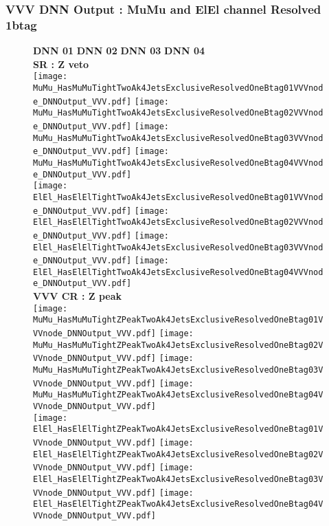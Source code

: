 \documentclass[9pt]{beamer}
\begin{document}
\begin{frame}
	\frametitle{VVV DNN Output : MuMu and ElEl channel Resolved 1btag}
	\begin{figure}
	    \textbf{DNN 01} \hspace{1.2cm} \textbf{DNN 02} \hspace{1.2cm} \textbf{DNN 03} \hspace{1.2cm} \textbf{DNN 04} \\
        \centering
        \textbf{SR : Z veto} \\
		\texttt{[image: MuMu\_HasMuMuTightTwoAk4JetsExclusiveResolvedOneBtag01VVVnode\_DNNOutput\_VVV.pdf]}
		\texttt{[image: MuMu\_HasMuMuTightTwoAk4JetsExclusiveResolvedOneBtag02VVVnode\_DNNOutput\_VVV.pdf]}
		\texttt{[image: MuMu\_HasMuMuTightTwoAk4JetsExclusiveResolvedOneBtag03VVVnode\_DNNOutput\_VVV.pdf]}
		\texttt{[image: MuMu\_HasMuMuTightTwoAk4JetsExclusiveResolvedOneBtag04VVVnode\_DNNOutput\_VVV.pdf]}\\
		\texttt{[image: ElEl\_HasElElTightTwoAk4JetsExclusiveResolvedOneBtag01VVVnode\_DNNOutput\_VVV.pdf]}
		\texttt{[image: ElEl\_HasElElTightTwoAk4JetsExclusiveResolvedOneBtag02VVVnode\_DNNOutput\_VVV.pdf]}
		\texttt{[image: ElEl\_HasElElTightTwoAk4JetsExclusiveResolvedOneBtag03VVVnode\_DNNOutput\_VVV.pdf]}
		\texttt{[image: ElEl\_HasElElTightTwoAk4JetsExclusiveResolvedOneBtag04VVVnode\_DNNOutput\_VVV.pdf]}\\
        \textbf{VVV CR : Z peak} \\
		\texttt{[image: MuMu\_HasMuMuTightZPeakTwoAk4JetsExclusiveResolvedOneBtag01VVVnode\_DNNOutput\_VVV.pdf]}
		\texttt{[image: MuMu\_HasMuMuTightZPeakTwoAk4JetsExclusiveResolvedOneBtag02VVVnode\_DNNOutput\_VVV.pdf]}
		\texttt{[image: MuMu\_HasMuMuTightZPeakTwoAk4JetsExclusiveResolvedOneBtag03VVVnode\_DNNOutput\_VVV.pdf]}
		\texttt{[image: MuMu\_HasMuMuTightZPeakTwoAk4JetsExclusiveResolvedOneBtag04VVVnode\_DNNOutput\_VVV.pdf]}\\
		\texttt{[image: ElEl\_HasElElTightZPeakTwoAk4JetsExclusiveResolvedOneBtag01VVVnode\_DNNOutput\_VVV.pdf]}
		\texttt{[image: ElEl\_HasElElTightZPeakTwoAk4JetsExclusiveResolvedOneBtag02VVVnode\_DNNOutput\_VVV.pdf]}
		\texttt{[image: ElEl\_HasElElTightZPeakTwoAk4JetsExclusiveResolvedOneBtag03VVVnode\_DNNOutput\_VVV.pdf]}
		\texttt{[image: ElEl\_HasElElTightZPeakTwoAk4JetsExclusiveResolvedOneBtag04VVVnode\_DNNOutput\_VVV.pdf]}\\
	\end{figure}
\end{frame}
\end{document}
